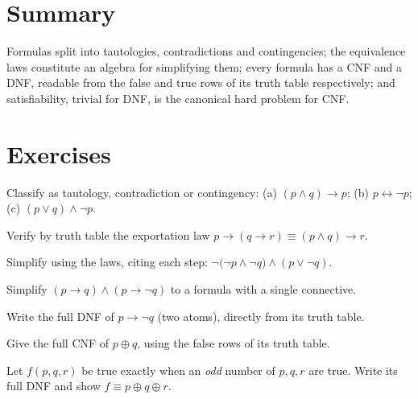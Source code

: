 \section{Summary}

Formulas split into tautologies, contradictions and contingencies; the
equivalence laws constitute an algebra for simplifying them; every formula has
a CNF and a DNF, readable from the false and true rows of its truth table
respectively; and satisfiability, trivial for DNF, is the canonical hard
problem for CNF.

\section*{Exercises}

\begin{exercise}{\easy}
Classify as tautology, contradiction or contingency:
(a) $(p \wedge q) \to p$;\quad
(b) $p \leftrightarrow \neg p$;\quad
(c) $(p \vee q) \wedge \neg p$.
\end{exercise}

\begin{exercise}{\easy}
Verify by truth table the exportation law
$p \to (q \to r) \equiv (p \wedge q) \to r$.
\end{exercise}

\begin{exercise}{\medium}
Simplify using the laws, citing each step:
$\neg\bigl(\neg p \wedge \neg q\bigr) \wedge (p \vee \neg q)$.
\end{exercise}

\begin{exercise}{\medium}
Simplify $(p \to q) \wedge (p \to \neg q)$ to a formula with a single
connective.
\end{exercise}

\begin{exercise}{\medium}
Write the full DNF of $p \to \neg q$ (two atoms), directly from its truth
table.
\end{exercise}

\begin{exercise}{\medium}
Give the full CNF of $p \oplus q$, using the false rows of its truth table.
\end{exercise}

\begin{exercise}{\hard}
Let $f(p,q,r)$ be true exactly when an \emph{odd} number of $p, q, r$ are
true. Write its full DNF and show $f \equiv p \oplus q \oplus r$.
\end{exercise}

